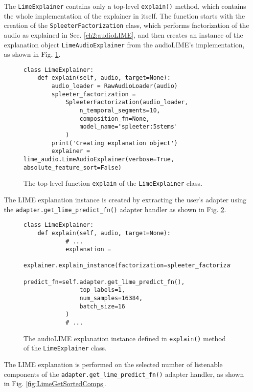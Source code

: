 \documentclass[
    bindingoffset=5mm,  %
    footnoteindent=3mm, %
    hyphenation=true    %
]{src/wut-thesis}
\begin{document}
The \texttt{LimeExplainer} contains only a top-level \texttt{explain()} method,
which contains the whole implementation of the explainer in itself. The function starts with the
creation of the \texttt{SpleeterFactorization} class, which performs factorization of the
audio as explained in Sec. \ref{ch2:audioLIME}, and then creates an instance of the explanation
object \texttt{LimeAudioExplainer} from the audioLIME’s implementation,
as shown in Fig. \ref{fig:LimeExplainMethod}.
 
\begin{figure}[h!]
\begin{verbatim}
class LimeExplainer:
    def explain(self, audio, target=None): 
        audio_loader = RawAudioLoader(audio)
        spleeter_factorization = 
            SpleeterFactorization(audio_loader,
                n_temporal_segments=10,
                composition_fn=None,
                model_name='spleeter:5stems'
            )
        print('Creating explanation object')
        explainer = lime_audio.LimeAudioExplainer(verbose=True, absolute_feature_sort=False)
\end{verbatim}
\caption{The top-level function \texttt{explain} of the \texttt{LimeExplainer} class.}
\label{fig:LimeExplainMethod}
\end{figure}

The LIME explanation instance is created by extracting the user's adapter using
the \texttt{adapter.get_lime_predict_fn()} adapter handler as shown in Fig. \ref{fig:LimeExplExecution}.

\begin{figure}[h!]
\begin{verbatim}
class LimeExplainer:
    def explain(self, audio, target=None):
            # ...
            explanation = 
            explainer.explain_instance(factorization=spleeter_factorization,
                predict_fn=self.adapter.get_lime_predict_fn(),
                top_labels=1,
                num_samples=16384,
                batch_size=16
            )
            # ...
\end{verbatim}
\caption{The audioLIME explanation instance defined in \texttt{explain()} method of the \texttt{LimeExplainer} class.}
\label{fig:LimeExplExecution}
\end{figure}

The LIME explanation is performed on the selected number of listenable components of
the \texttt{adapter.get_lime_predict_fn()} adapter handler, as shown in Fig. \ref{fig:LimeGetSortedComps}.
\end{document}
